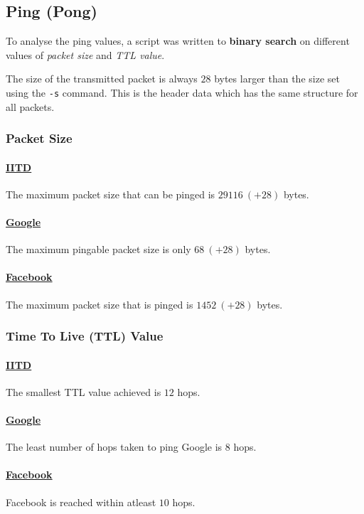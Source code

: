 \documentclass[11pt]{article}
\begin{document}
\subsection{Ping (Pong)}
To analyse the ping values, a script was written to \textbf{binary search} on different values of \textit{packet size} and \textit{TTL value}.\par
The size of the transmitted packet is always $28$ bytes larger than the size set using the \texttt{-s} command. This is the header data which has the same structure for all packets.

\subsubsection{Packet Size}

\paragraph{\href{https://www.iitd.ac.in}{IITD}} The maximum packet size that can be pinged is $29116\ (+28)$ bytes.
\paragraph{\href{https://www.google.com}{Google}} The maximum pingable packet size is only $68\ (+28)$ bytes.
\paragraph{\href{https://www.facebook.com}{Facebook}} The maximum packet size that is pinged is $1452\ (+28)$ bytes.

\subsubsection{Time To Live (TTL) Value}

\paragraph{\href{https://www.iitd.ac.in}{IITD}} The smallest TTL value achieved is $12$ hops.
\paragraph{\href{https://www.google.com}{Google}} The least number of hops taken to ping Google is $8$ hops.
\paragraph{\href{https://www.facebook.com}{Facebook}} Facebook is reached within atleast $10$ hops.
\end{document}
